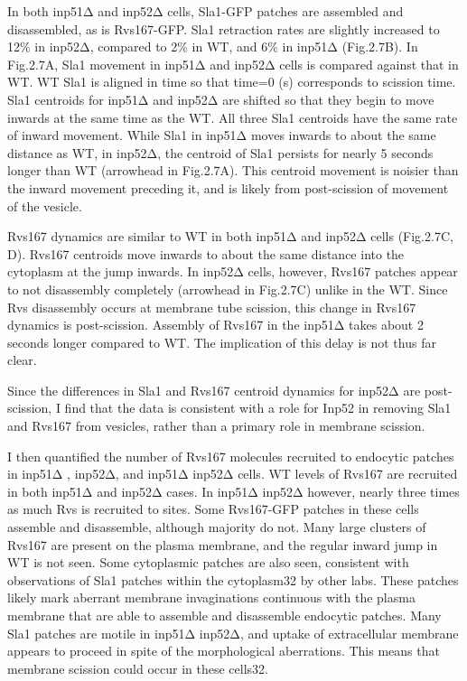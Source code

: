 In both inp51Δ and inp52Δ cells, Sla1-GFP patches are assembled and disassembled, as is Rvs167-GFP. Sla1 retraction rates are slightly increased to 12\% in inp52Δ, compared to 2\% in WT, and 6\% in inp51Δ (Fig.2.7B). In Fig.2.7A, Sla1 movement in inp51Δ and inp52Δ cells is compared against that in WT. WT Sla1 is aligned in time so that time=0 (s) corresponds to scission time. Sla1 centroids for inp51Δ and inp52Δ are shifted so that they begin to move inwards at the same time as the WT. All three Sla1 centroids have the same rate of inward movement. While Sla1 in inp51Δ moves inwards to about the same distance as WT, in inp52Δ, the centroid of Sla1 persists for nearly 5 seconds longer than WT (arrowhead in Fig.2.7A). This centroid movement is noisier than the inward movement preceding it, and is likely from post-scission of movement of the vesicle. 
	\vspace{5mm}
	
Rvs167 dynamics are similar to WT in both inp51Δ and inp52Δ cells (Fig.2.7C, D). Rvs167 centroids move inwards to about the same distance into the cytoplasm at the jump inwards. In inp52Δ cells, however, Rvs167 patches appear to not disassembly completely (arrowhead in Fig.2.7C) unlike in the WT. Since Rvs disassembly occurs at membrane tube scission, this change in Rvs167 dynamics is post-scission. Assembly of Rvs167 in the inp51Δ takes about 2 seconds longer compared to WT. The implication of this delay is not thus far clear. 
	\vspace{5mm}

Since the differences in Sla1 and Rvs167 centroid dynamics for inp52Δ are post-scission, I find that the data is consistent with a role for Inp52 in removing Sla1 and Rvs167 from vesicles, rather than a primary role in membrane scission. 




	
I then quantified the number of Rvs167 molecules recruited to endocytic patches in inp51Δ , inp52Δ, and inp51Δ inp52Δ cells.  WT levels of Rvs167 are recruited in both inp51Δ and inp52Δ cases. In inp51Δ inp52Δ however, nearly three times as much Rvs is recruited to sites. Some Rvs167-GFP patches in these cells assemble and disassemble, although majority do not. Many large clusters of Rvs167 are present on the plasma membrane, and the regular inward jump in WT is not seen. Some cytoplasmic patches are also seen, consistent with observations of Sla1 patches within the cytoplasm32 by other labs. These patches likely mark aberrant membrane invaginations continuous with the plasma membrane that are able to assemble and disassemble endocytic patches. Many Sla1 patches are motile in inp51Δ inp52Δ, and uptake of extracellular membrane appears to proceed in spite of the morphological aberrations. This means that membrane scission could occur in these cells32. 


